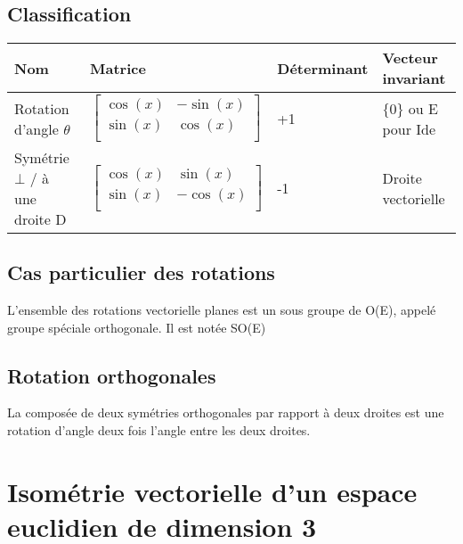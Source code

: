 \subsection{Classification}
\begin{center}
\begin{tabular}{|l|l|l|l|}
\hline
 Nom &Matrice & Déterminant & Vecteur invariant \\ \hline
Rotation d'angle $\theta$ & $\begin{bmatrix}
 \cos(x) & -\sin (x) \\
  \sin (x) & \cos(x) \\
\end{bmatrix}$  & +1 & $\{0\}$ ou E pour Ide \\ \hline
Symétrie $\bot$ / à une droite D & $\begin{bmatrix}
 \cos(x) & \sin (x) \\
  \sin (x) & -\cos(x) \\
\end{bmatrix}$  & -1 & Droite vectorielle \\ \hline
\end{tabular}
\end{center}
\subsection{Cas particulier des rotations}
\begin{prop}
L'ensemble des rotations vectorielle planes est un sous groupe de O(E), appelé groupe spéciale orthogonale. Il est notée SO(E)
\end{prop}
\subsection{Rotation orthogonales}
\begin{prop}
La composée de deux symétries orthogonales par rapport à deux droites est une rotation d'angle deux fois l'angle entre les deux droites.
\end{prop}
\section{Isométrie vectorielle d'un espace euclidien de dimension 3}
